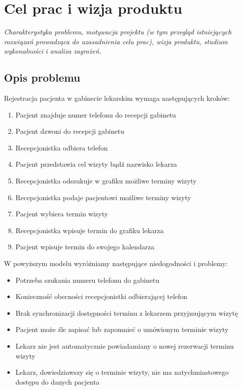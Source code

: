 \documentclass[polish,12pt]{aghthesis}
\author{Maria Matuszek\\ Wojciech Karpiel\\ Michał Hamuda\\ Filip Galas}
\date{2017}
\begin{document}
\maketitle

\tableofcontents

\section{Cel prac i wizja produktu}
\label{sec:cel-wizja}
\emph{Charakterystyka problemu, motywacja projektu (w tym przegląd
  istniejących rozwiązań prowadząca do uzasadnienia celu prac),
  wizja produktu, studium wykonalności i analiza zagrożeń.}
  
\subsection{Opis problemu}
Rejestracja pacjenta w gabinecie lekarskim wymaga następujących kroków:

\begin{enumerate}
  \item Pacjent znajduje numer telefonu do recepcji gabinetu
  \item Pacjent dzwoni do recepcji gabinetu
  \item Recepcjonistka odbiera telefon
  \item Pacjent przedstawia cel wizyty bądź nazwisko lekarza
  \item Recepcjonistka odszukuje w grafiku możliwe terminy wizyty
  \item Recepcjonistka podaje pacjentowi możliwe terminy wizyty
  \item Pacjent wybiera termin wizyty
  \item Recepcjonistka wpisuje termin do grafiku lekarza
  \item Pacjent wpisuje termin do swojego kalendarza
\end{enumerate}

W powyższym modelu wyróżniamy następujące niedogodności i problemy:

\begin{itemize}
  \item Potrzeba szukania numeru telefonu do gabinetu
  \item Konieczność obecności recepcjonistki odbierającej telefon
  \item Brak synchronizacji dostępności terminu z lekarzem przyjmującym wizytę
  \item Pacjent może źle zapisać lub zapomnieć o umówionym terminie wizyty
  \item Lekarz nie jest automatycznie powiadamiany o nowej rezerwacji terminu wizyty
  \item Lekarz, dowiedziawszy się o terminie wizyty, nie ma natychmiastowego dostępu do danych pacjenta
\end{itemize}
\end{document}
